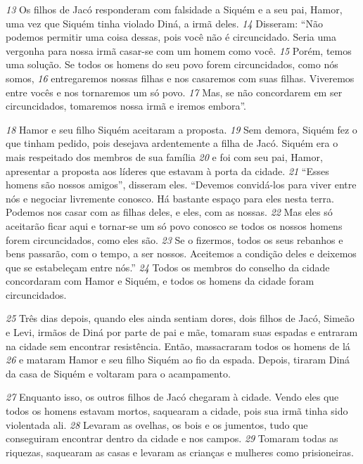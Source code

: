 \bigskip   
\textit{\tiny 13}
Os filhos de Jacó responderam com falsidade a Siquém e a seu pai, Hamor,
uma vez que Siquém tinha violado Diná, a irmã deles. 
\textit{\tiny 14}
Disseram: “Não podemos
permitir uma coisa dessas, pois você não é circuncidado. Seria uma vergonha para
nossa irmã casar-se com um homem como você. 
\textit{\tiny 15}
Porém, temos uma solução. Se
todos os homens do seu povo forem circuncidados, como nós somos,
\textit{\tiny 16}
entregaremos nossas filhas e nos casaremos com suas filhas. Viveremos entre
vocês e nos tornaremos um só povo. 
\textit{\tiny 17}
Mas, se não concordarem em ser
circuncidados, tomaremos nossa irmã e iremos embora”.
   
\bigskip   
\textit{\tiny 18}
Hamor e seu filho Siquém aceitaram a proposta. 
\textit{\tiny 19}
Sem demora, Siquém fez
o que tinham pedido, pois desejava ardentemente a filha de Jacó. Siquém era o
mais respeitado dos membros de sua família 
\textit{\tiny 20}
e foi com seu pai, Hamor,
apresentar a proposta aos líderes que estavam à porta da cidade.
\textit{\tiny 21}
“Esses homens são nossos amigos”, disseram eles. “Devemos convidá-los para
viver entre nós e negociar livremente conosco. Há bastante espaço para eles nesta
terra. Podemos nos casar com as filhas deles, e eles, com as nossas. 
\textit{\tiny 22}
Mas eles só
aceitarão ficar aqui e tornar-se um só povo conosco se todos os nossos homens
forem circuncidados, como eles são. 
\textit{\tiny 23}
Se o fizermos, todos os seus rebanhos e
bens passarão, com o tempo, a ser nossos. Aceitemos a condição deles e deixemos
que se estabeleçam entre nós.”
\textit{\tiny 24}
Todos os membros do conselho da cidade concordaram com Hamor e
Siquém, e todos os homens da cidade foram circuncidados. 

\bigskip   
\textit{\tiny 25}
Três dias depois,
quando eles ainda sentiam dores, dois filhos de Jacó, Simeão e Levi, irmãos de
Diná por parte de pai e mãe, tomaram suas espadas e entraram na cidade sem
encontrar resistência. Então, massacraram todos os homens de lá 
\textit{\tiny 26}
e mataram
Hamor e seu filho Siquém ao fio da espada. Depois, tiraram Diná da casa de
Siquém e voltaram para o acampamento.
   
\bigskip   
\textit{\tiny 27}
Enquanto isso, os outros filhos de Jacó chegaram à cidade. Vendo eles que
todos os homens estavam mortos, saquearam a cidade, pois sua irmã tinha sido
violentada ali. 
\textit{\tiny 28}
Levaram as ovelhas, os bois e os jumentos, tudo que conseguiram
encontrar dentro da cidade e nos campos. 
\textit{\tiny 29}
Tomaram todas as riquezas,
saquearam as casas e levaram as crianças e mulheres como prisioneiras.
   
